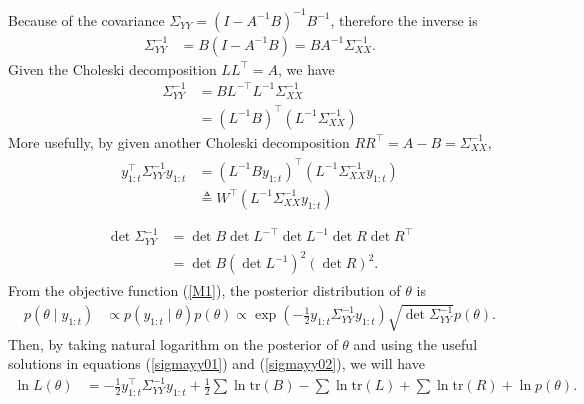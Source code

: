 Because of the covariance  $\Sigma_{YY} =  \left(I-A^{-1}B\right)^{-1}B^{-1}$, therefore the inverse is 
\begin{align*}
\Sigma_{YY}^{-1} &= B\left(I-A^{-1}B\right)= BA^{-1}\Sigma_{XX}^{-1}.
\end{align*}
Given the Choleski decomposition $LL^\top = A$, we have
\begin{align*}
\Sigma_{YY}^{-1} &=BL^{-\top}L^{-1}\Sigma_{XX}^{-1}\\
&=\left(L^{-1}B\right)^\top\left(L^{-1}\Sigma_{XX}^{-1}\right) %
\end{align*}
More usefully, by given another Choleski decomposition $RR^\top=A-B=\Sigma_{XX}^{-1}$,
\begin{align}\label{sigmayy01}
\begin{split}
y_{1:t}^\top \Sigma_{YY}^{-1} y_{1:t} &= \left(L^{-1}By_{1:t}\right)^\top\left(L^{-1}\Sigma_{XX}^{-1}y_{1:t}\right)\\
&\triangleq W^\top \left(L^{-1}\Sigma_{XX}^{-1}y_{1:t}\right)\\
\end{split}
\end{align}
\begin{align}\label{sigmayy02}
\begin{split}
\det\Sigma_{YY}^{-1} &= \det B \det L^{-\top}\det L^{-1}\det R\det R^\top\\
&= \det B\left(\det L^{-1}\right)^2\left(\det R\right)^2.
\end{split}
\end{align}
From the objective function (\ref{M1}), the posterior distribution of $\theta$ is 
\begin{align*}
p\left(\theta \mid y_{1:t}\right) &\propto p\left(y_{1:t}\mid\theta\right)p\left(\theta\right) \propto \exp\left( -\frac{1}{2} y_{1:t} \Sigma_{YY}^{-1} y_{1:t} \right) \sqrt{\det \Sigma_{YY}^{-1}} p\left(\theta\right).
\end{align*}
Then, by taking natural logarithm on the posterior of $\theta$ and using the useful solutions in equations (\ref{sigmayy01}) and (\ref{sigmayy02}), we will have
\begin{align}
\ln L\left(\theta\right) &= -\frac{1}{2}y_{1:t}^\top\Sigma_{YY}^{-1}y_{1:t}+\frac{1}{2}\sum\ln\mbox{tr}\left(B\right)-\sum\ln\mbox{tr}\left(L\right)+\sum\ln\mbox{tr}\left(R\right) + \ln p\left(\theta\right).
\end{align}



